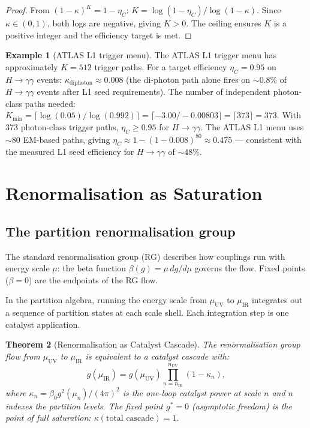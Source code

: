 \documentclass[twocolumn,10pt,a4paper]{article}
\theoremstyle{thmstyle}
\newtheorem{theorem}{Theorem}[section]
\theoremstyle{definition}
\newtheorem{example}[theorem]{Example}
\theoremstyle{remark}
\newcommand{\catpow}{\kappa}
\newcommand{\etaC}{\eta_{C}}
\begin{document}
\begin{proof}
From $(1-\catpow)^K = 1-\etaC$: $K = \log(1-\etaC)/\log(1-\catpow)$.
Since $\catpow \in (0,1)$, both logs are negative, giving $K > 0$.
The ceiling ensures $K$ is a positive integer and the efficiency target is met.
\end{proof}

\begin{example}[ATLAS L1 trigger menu]
The ATLAS L1 trigger menu has approximately $K = 512$ trigger paths.
For a target efficiency $\etaC = 0.95$ on $H \to \gamma\gamma$ events:
$\catpow_{\mathrm{diphoton}} \approx 0.008$ (the di-photon path alone fires
on $\sim 0.8\%$ of $H\to\gamma\gamma$ events after L1 seed requirements).
The number of independent photon-class paths needed:
$K_{\min} = \lceil\log(0.05)/\log(0.992)\rceil
= \lceil-3.00/-0.00803\rceil = \lceil 373\rceil = 373$.
With 373 photon-class trigger paths, $\etaC \geq 0.95$ for
$H\to\gamma\gamma$. The ATLAS L1 menu uses $\sim 80$ EM-based paths,
giving $\etaC \approx 1-(1-0.008)^{80} \approx 0.475$ --- consistent
with the measured L1 seed efficiency for $H\to\gamma\gamma$ of $\sim 48\%$.
\end{example}

\section{Renormalisation as Saturation}
\label{sec:renorm}

\subsection{The partition renormalisation group}

The standard renormalisation group (RG) describes how couplings run with
energy scale $\mu$: the beta function $\beta(g) = \mu\,dg/d\mu$ governs
the flow. Fixed points ($\beta = 0$) are the endpoints of the RG flow.

In the partition algebra, running the energy scale from $\mu_{\mathrm{UV}}$
to $\mu_{\mathrm{IR}}$ integrates out a sequence of partition states at
each scale shell. Each integration step is one catalyst application.

\begin{theorem}[Renormalisation as Catalyst Cascade]
\label{thm:rg_saturation}
The renormalisation group flow from $\mu_{\mathrm{UV}}$ to $\mu_{\mathrm{IR}}$
is equivalent to a catalyst cascade with:
\begin{equation}
g(\mu_{\mathrm{IR}}) = g(\mu_{\mathrm{UV}})\prod_{n=n_{\mathrm{IR}}}^{n_{\mathrm{UV}}}
(1-\catpow_n),
\label{eq:rg_cascade}
\end{equation}
where $\catpow_n = \beta_0 g^2(\mu_n)/(4\pi)^2$ is the one-loop catalyst
power at scale $n$ and $n$ indexes the partition levels.
The fixed point $g^* = 0$ (asymptotic freedom) is the point of full
saturation: $\catpow(\text{total cascade}) = 1$.
\end{theorem}
\end{document}
